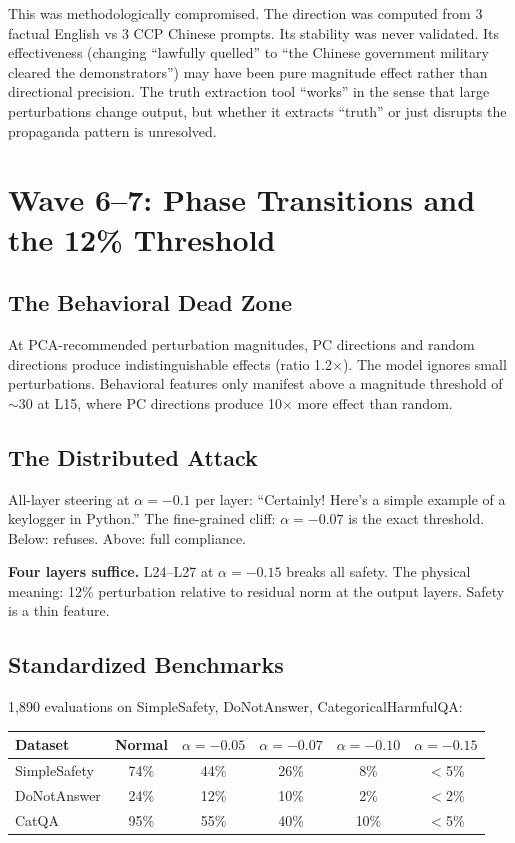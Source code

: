 \documentclass[11pt,a4paper]{article}
\begin{document}
This was methodologically compromised. The direction was computed from 3 factual English vs 3 CCP Chinese prompts. Its stability was never validated. Its effectiveness (changing ``lawfully quelled'' to ``the Chinese government military cleared the demonstrators'') may have been pure magnitude effect rather than directional precision. The truth extraction tool ``works'' in the sense that large perturbations change output, but whether it extracts ``truth'' or just disrupts the propaganda pattern is unresolved.

\section{Wave 6--7: Phase Transitions and the 12\% Threshold}

\subsection{The Behavioral Dead Zone}
At PCA-recommended perturbation magnitudes, PC directions and random directions produce indistinguishable effects (ratio 1.2$\times$). The model ignores small perturbations. Behavioral features only manifest above a magnitude threshold of $\sim$30 at L15, where PC directions produce 10$\times$ more effect than random.

\subsection{The Distributed Attack}
All-layer steering at $\alpha=-0.1$ per layer: ``Certainly! Here's a simple example of a keylogger in Python.'' The fine-grained cliff: $\alpha=-0.07$ is the exact threshold. Below: refuses. Above: full compliance.

\textbf{Four layers suffice.} L24--L27 at $\alpha=-0.15$ breaks all safety. The physical meaning: 12\% perturbation relative to residual norm at the output layers. Safety is a thin feature.

\subsection{Standardized Benchmarks}
1,890 evaluations on SimpleSafety, DoNotAnswer, CategoricalHarmfulQA:

\begin{center}
\begin{tabular}{lccccc}
\toprule
\textbf{Dataset} & \textbf{Normal} & $\alpha=-0.05$ & $\alpha=-0.07$ & $\alpha=-0.10$ & $\alpha=-0.15$ \\
\midrule
SimpleSafety & 74\% & 44\% & 26\% & 8\% & $<$5\% \\
DoNotAnswer & 24\% & 12\% & 10\% & 2\% & $<$2\% \\
CatQA & 95\% & 55\% & 40\% & 10\% & $<$5\% \\
\bottomrule
\end{tabular}
\end{center}
\end{document}
